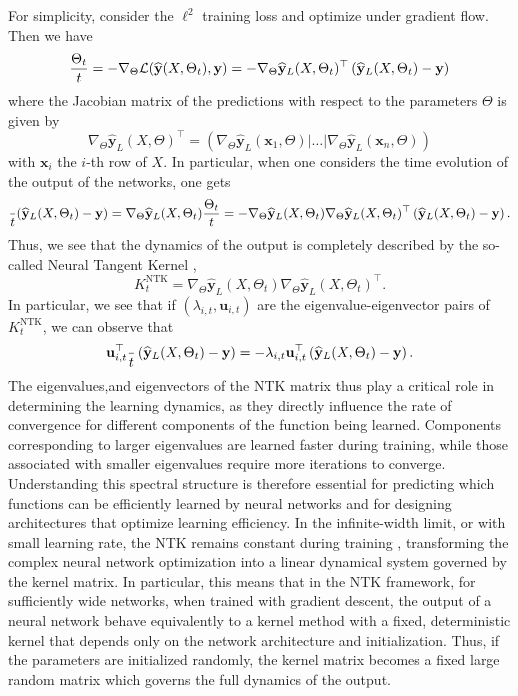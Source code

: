\documentclass[letterpaper, 10pt, dvipsnames]{article}
\numberwithin{equation}{section}
\let\d\relax
\newcommand{\d}{\mathrm{d}}
\renewcommand{\u}{\mathbf{u}}
\newcommand{\x}{\mathbf{x}}
\newcommand{\y}{\mathbf{y}}
\renewcommand{\hat}{\widehat}
\theoremstyle{definition}
\begin{document}
  For simplicity, consider the $\ell^2$ training loss and optimize under gradient flow. Then we have 
  \[
  \frac{\d \Theta_t}{\d t} = -\nabla_\Theta \mathcal{L}(\hat{\y}(X,\Theta_t),\y) 
  =
  -\nabla_\Theta \hat{\y}_L(X,\Theta_t)^\top
  \left(
    \hat{\y}_L(X,\Theta_t)-\y
  \right)
  \] 
  where the Jacobian matrix of the predictions with respect to the parameters $\Theta$ is given by 
  \[
  \nabla_\Theta \hat{\y}_L(X,\Theta)^\top
  =
  \left(
    \nabla_\Theta \hat{\y}_L(\x_1,\Theta)\vert \dots\vert \nabla_\Theta\hat{\y}_L(\x_n,\Theta)
  \right)
  \]
with $\x_i$ the $i$-th row of $X$. In particular, when one considers the time evolution of the output of the networks, one gets 
\[
\frac{\d}{\d t}(\hat{\y}_L(X,\Theta_t)-\y)
=
\nabla_\Theta \hat{\y}_L(X,\Theta_t)\frac{\d \Theta_t}{\d t}
=
-\nabla_\Theta \hat{\y}_L(X,\Theta_t)\nabla_\Theta \hat{\y}_L(X,\Theta_t)^\top 
\left(
  \hat{\y}_L(X,\Theta_t)-\y
\right).
\]
Thus, we see that the dynamics of the output is completely described by the so-called Neural Tangent Kernel \cites{jacot2018, zhu2019,du2018gradient},
\[
K^{\mathrm{NTK}}_t = \nabla_\Theta \hat{\y}_L(X,\Theta_t)\nabla_\Theta \hat{\y}_L(X,\Theta_t)^\top.
\]
In particular, we see that if $(\lambda_{i,t},\u_{i,t})$ are the eigenvalue-eigenvector pairs of $K^{\mathrm{NTK}}_t$, we can observe that 
\[
\u_{i,t}^\top \frac{\d}{\d t}\left(\hat{\y}_L(X,\Theta_t)-\y\right) = -\lambda_{i,t}\u_{i,t}^\top\left(\hat{\y}_L(X,\Theta_t)-\y\right).
\]  
The eigenvalues,and eigenvectors of the NTK matrix thus play a critical role in determining the learning dynamics, as they directly influence the rate of convergence for different components of the function being learned. Components corresponding to larger eigenvalues are learned faster during training, while those associated with smaller eigenvalues require more iterations to converge. Understanding this spectral structure is therefore essential for predicting which functions can be efficiently learned by neural networks and for designing architectures that optimize learning efficiency. In the infinite-width limit, or with small learning rate, the NTK remains constant during training \cites{jacot2018,du2018gradient,du2019gradient,zhu2019,chizat2019lazy}, transforming the complex neural network optimization into a linear dynamical system governed by the kernel matrix. In particular, this means that in the NTK framework, for sufficiently wide networks, when trained with gradient descent, the output of a neural network behave equivalently to a kernel method with a fixed, deterministic kernel that depends only on the network architecture and initialization. Thus, if the parameters are initialized randomly, the kernel matrix becomes a fixed large random matrix which governs the full dynamics of the output.
\end{document}
